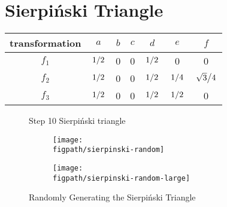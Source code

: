 \documentclass[12pt,a4paper]{article}
\newcommand{\figpath}{../fig}
\begin{document}
    \section{Sierpiński Triangle}
    \begin{figure}[htb!]
        \centering
    \end{figure}
    \begin{table}
        \centering
        \begin{tabular}{|c|c|c|c|c|c|c|}
            \hline
            transformation & $a$ & $b$ & $c$ & $d$ & $e$ & $f$ \\
            \hline
            $f_1$ & $\flatfrac{1}{2}$ & 0 & 0 & $\flatfrac{1}{2}$ & 0 & 0 \\
            \hline
            $f_2$ & $\flatfrac{1}{2}$ & 0 & 0 & $\flatfrac{1}{2}$ & $\flatfrac{1}{4}$ & $\flatfrac{\sqrt{3}}{4}$ \\
            \hline
            $f_3$ & $\flatfrac{1}{2}$ & 0 & 0 & $\flatfrac{1}{2}$ & $\flatfrac{1}{2}$ & 0 \\
            \hline
        \end{tabular}
    \end{table}
    \begin{figure}
        \centering
        \centering
        \caption{Step 10 Sierpiński triangle}
    \end{figure}
    \thispagestyle{empty}
    \begin{figure}
        \centering
        \begin{subfigure}{\linewidth}
            \centering
            \texttt{[image: \\figpath/sierpinski-random]}
        \end{subfigure}
        \begin{subfigure}{\linewidth}
            \centering
            \texttt{[image: \\figpath/sierpinski-random-large]}
        \end{subfigure}
        \caption{Randomly Generating the Sierpiński Triangle}
    \end{figure}
    \FloatBarrier
    \restoregeometry
\end{document}
